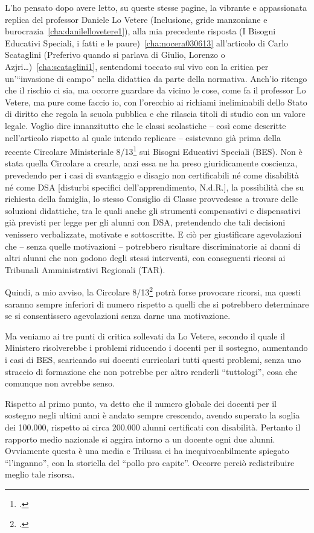 L'ho pensato dopo avere letto, su queste stesse pagine, la vibrante e appassionata replica del professor Daniele Lo Vetere (Inclusione, gride manzoniane e burocrazia~\ref{cha:danilellovetere1}), alla mia precedente risposta (I Bisogni Educativi Speciali, i fatti e le paure)~\ref{cha:nocera030613} all'articolo di Carlo Scataglini (Preferivo quando si parlava di Giulio, Lorenzo o Azjri…)~\ref{cha:scataglini1}, sentendomi toccato sul vivo con la critica per un'“invasione di campo” nella didattica da parte della normativa. Anch'io ritengo che il rischio ci sia, ma occorre guardare da vicino le cose, come fa il professor Lo Vetere, ma pure come faccio io, con l'orecchio ai richiami ineliminabili dello Stato di diritto che regola la scuola pubblica e che rilascia titoli di studio con un valore legale.
Voglio dire innanzitutto che le classi scolastiche – così come descritte nell'articolo rispetto al quale intendo replicare – esistevano già prima della recente Circolare Ministeriale 8/13\footcite{cm8_2013} sui Bisogni Educativi Speciali (BES). Non è stata quella Circolare a crearle, anzi essa ne ha preso giuridicamente coscienza, prevedendo per i casi di svantaggio e disagio non certificabili né come disabilità né come DSA [disturbi specifici dell'apprendimento, N.d.R.], la possibilità che su richiesta della famiglia, lo stesso Consiglio di Classe provvedesse a trovare delle soluzioni didattiche, tra le quali anche gli strumenti compensativi e dispensativi già previsti per legge per gli alunni con DSA, pretendendo che tali decisioni venissero verbalizzate, motivate e sottoscritte. E ciò per giustificare agevolazioni che – senza quelle motivazioni – potrebbero risultare discriminatorie ai danni di altri alunni che non godono degli stessi interventi, con conseguenti ricorsi ai Tribunali Amministrativi Regionali (TAR).

Quindi, a mio avviso, la Circolare 8/13\footcite{cm8_2013} potrà forse provocare ricorsi, ma questi saranno sempre inferiori di numero rispetto a quelli che si potrebbero determinare se si consentissero agevolazioni senza darne una motivazione.

Ma veniamo ai tre punti di critica sollevati da Lo Vetere, secondo il quale il Ministero risolverebbe i problemi riducendo i docenti per il sostegno, aumentando i casi di BES, scaricando sui docenti curricolari tutti questi problemi, senza uno straccio di formazione che non potrebbe per altro renderli “tuttologi”, cosa che comunque non avrebbe senso.

Rispetto al primo punto, va detto che il numero globale dei docenti per il sostegno negli ultimi anni è andato sempre crescendo, avendo superato la soglia dei 100.000, rispetto ai circa 200.000 alunni certificati con disabilità. Pertanto il rapporto medio nazionale si aggira intorno a un docente ogni due alunni. Ovviamente questa è una media e Trilussa ci ha inequivocabilmente spiegato “l'inganno”, con la storiella del “pollo pro capite”. Occorre perciò redistribuire meglio tale risorsa.

